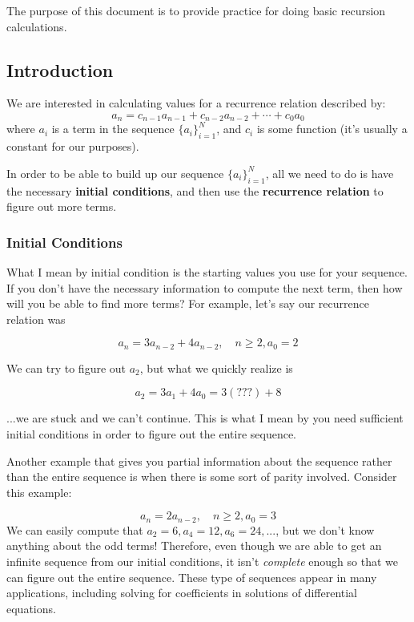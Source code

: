 The purpose of this document is to provide practice for doing basic recursion calculations.

\subsection{Introduction}
We are interested in calculating values for a recurrence relation described by:
\begin{equation}
    a_n = c_{n-1}a_{n-1}+c_{n-2}a_{n-2}+\cdots+c_0a_0
\end{equation}
where $a_i$ is a term in the sequence $\{a_i\}_{i=1}^{N}$, and $c_i$ is some function (it's usually a constant for our purposes).

In order to be able to build up our sequence $\{a_i\}_{i=1}^{N}$, all we need to do is have the necessary \textbf{initial conditions}, and then use the \textbf{recurrence relation} to figure out more terms. 

\subsubsection{Initial Conditions}
What I mean by initial condition is the starting values you use for your sequence. If you don't have the necessary information to compute the next term, then how will you be able to find more terms? For example, let's say our recurrence relation was

\begin{equation}
    a_n = 3a_{n-2}+4a_{n-2}, \quad n\geq2, a_0 = 2
\end{equation}

We can try to figure out $a_2$, but what we quickly realize is 

$$a_2 = 3a_1+4a_0 = 3(???)+8$$

...we are stuck and we can't continue. This is what I mean by you need sufficient initial conditions in order to figure out the entire sequence. 

Another example that gives you partial information about the sequence rather than the entire sequence is when there is some sort of parity involved. Consider this example:

\begin{equation}
    a_n = 2a_{n-2}, \quad n\geq 2, a_0=3
\end{equation}
We can easily compute that $a_2=6, a_4=12, a_6=24, ...$, but we don't know anything about the odd terms! Therefore, even though we are able to get an infinite sequence from our initial conditions, it isn't \textit{complete} enough so that we can figure out the entire sequence. These type of sequences appear in many applications, including solving for coefficients in solutions of differential equations.

